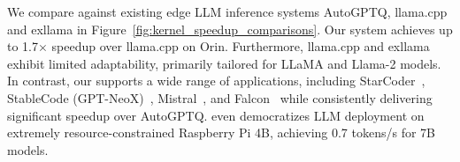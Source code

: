 We compare \system against existing edge LLM inference systems AutoGPTQ, llama.cpp and exllama in Figure~\ref{fig:kernel_speedup_comparisons}. Our system achieves up to 1.7$\times$ speedup over llama.cpp on Orin. Furthermore, llama.cpp and exllama exhibit limited adaptability, primarily tailored for LLaMA and Llama-2 models. In contrast, our \system supports a wide range of applications, including StarCoder~\cite{li2023starcoder}, StableCode (GPT-NeoX)~\cite{black2022gpt}, Mistral~\cite{jiang2023mistral}, and Falcon~\cite{penedo2023refinedweb} while consistently delivering significant speedup over AutoGPTQ. \system even democratizes LLM deployment on extremely resource-constrained Raspberry Pi 4B, achieving 0.7 tokens/s for 7B models. 















